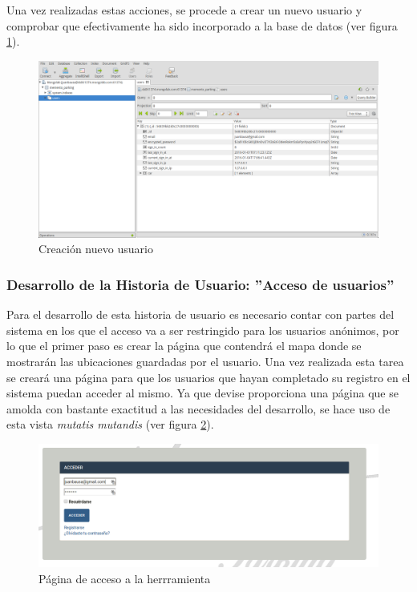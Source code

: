 	Una vez realizadas estas acciones, se procede a crear un nuevo usuario y comprobar que efectivamente ha sido incorporado a la base de datos (ver figura \ref{fig:acceso_usuarios_07}).
	
	\begin{figure}[H]
		\centering
		\includegraphics[width=15cm, fbox={\fboxrule} 4mm]{images/05-resultados/10-acceso_usuarios_7.png}
		\caption{Creación nuevo usuario}
		\label{fig:acceso_usuarios_07}
	\end{figure}
	
	\subsubsection{Desarrollo de la Historia de Usuario: ''Acceso de usuarios'' }
	Para el desarrollo de esta historia de usuario es necesario contar con partes del sistema en los que el acceso va a ser restringido para los usuarios anónimos, por lo que el primer paso es crear la página que contendrá el mapa donde se mostrarán las ubicaciones guardadas por el usuario.
	Una vez realizada esta tarea se creará una página para que los usuarios que hayan completado su registro en el sistema puedan acceder al mismo. Ya que devise proporciona una página que se amolda con bastante exactitud a las necesidades del desarrollo, se hace uso de esta vista \textit{mutatis mutandis} (ver figura \ref{fig:acceso_usuarios_08}).
	
	\begin{figure}[H]
		\centering
		\includegraphics[width=15cm, fbox={\fboxrule} 4mm]{images/05-resultados/11-acceso_usuarios_8.png}
		\caption{Página de acceso a la herrramienta}
		\label{fig:acceso_usuarios_08}
	\end{figure}	
	
